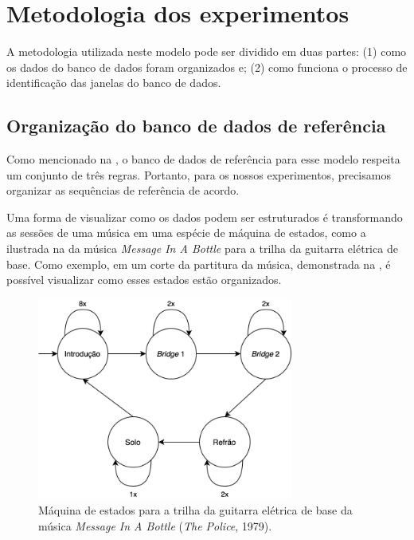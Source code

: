 \section{Metodologia dos experimentos}
\label{sec:dtw-metodology}

A metodologia utilizada neste modelo pode ser dividido em duas partes: (1) como os dados do banco de dados foram organizados e; (2) como funciona o processo de identificação das janelas do banco de dados.

\subsection{Organização do banco de dados de referência}

Como mencionado na , o banco de dados de referência para esse modelo respeita um conjunto de três regras. Portanto, para os nossos experimentos, precisamos organizar as sequências de referência de acordo.

Uma forma de visualizar como os dados podem ser estruturados é transformando as sessões de uma música em uma espécie de máquina de estados, como a ilustrada na  da música \textit{Message In A Bottle} para a trilha da guitarra elétrica de base. Como exemplo, em um corte da partitura da música, demonstrada na , é possível visualizar como esses estados estão organizados. 

\begin{figure}[htbp]
    \centering
    \includegraphics[width=0.75\textwidth]{images/MIAB state machine.png}
    \caption{Máquina de estados para a trilha da guitarra elétrica de base da música \textit{Message In A Bottle} (\textit{The Police}, 1979).}
    \label{fig:miab_state_machine}
\end{figure}


